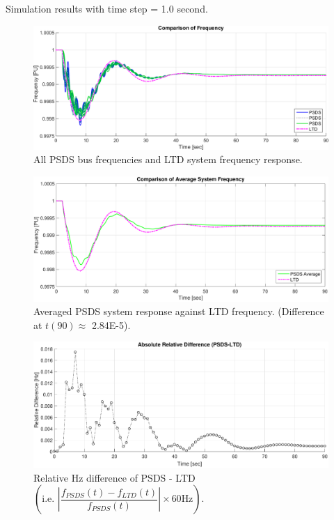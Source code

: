 \documentclass[12pt]{article}
\newcommand{\figW}{1}
\newcommand{\figH}{.26}
\begin{document}
Simulation results with time step = 1.0 second.

	\begin{figure}[h!]
			\centering
			\includegraphics[width=\figW\linewidth,height=\figH\textheight]{fcomp.png}\vspace{-1em}
			\caption{All PSDS bus frequencies and LTD system frequency response.}
			\label{fcomp}		 
	\end{figure}\vspace{-2em}
	\begin{figure}[h!]
				\centering
				\includegraphics[width=\figW\linewidth,height=\figH\textheight]{aveFg}  \vspace{-2em}
				\caption{Averaged PSDS system response against LTD frequency. (Difference at $t(90) \approx$ 2.84E-5).} 
				\label{aveF}
	\end{figure}\vspace{-2em}
	\begin{figure}[h!]	
				\centering
				\includegraphics[width=\figW\linewidth,height=\figH\textheight]{relDif}  \vspace{-1.5em}
				\caption{Relative Hz difference of PSDS - LTD $\left( \text{i.e. }  \left|\dfrac{f_{PSDS}(t)- f_{LTD}(t)}{f_{PSDS}(t)}\right| \times 60 \text{Hz} \right)$.}
				\label{redDif}
	\end{figure}
\end{document}
